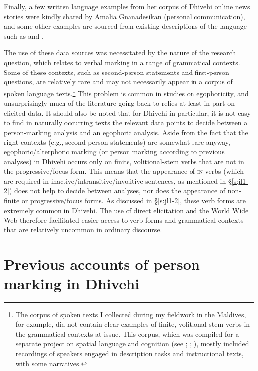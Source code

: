\documentclass[output=paper]{langsci/langscibook}
\begin{document}
   Finally, a few written language examples from her corpus of Dhivehi online news stories were kindly shared by Amalia Gnanadesikan (personal communication), and some other examples are sourced from existing descriptions of the language such as \cite{CainGair2000} and \cite{Gnanadesikan2017}. 

   The use of these data sources was necessitated by the nature of the research question, which relates to verbal marking in a range of grammatical contexts. Some of these contexts, such as second-person statements and first-person questions, are relatively rare and may not necessarily appear in a corpus of spoken language texts.\footnote{The corpus of spoken texts I collected during my fieldwork in the Maldives, for example, did not contain clear examples of finite, volitional-stem verbs in the grammatical contexts at issue. This corpus, which was compiled for a separate project on spatial language and cognition (see \citealt{Lum2018}; \citealt{Palmer2017SIP}; \citealt{Palmer2017Typ}), mostly included recordings of speakers engaged in description tasks and instructional texts, with some narratives.} 
   This problem is common in studies on egophoricity, and unsurprisingly much of the literature going back to \cite{Hale1980} relies at least in part on elicited data. It should also be noted that for Dhivehi in particular, it is not easy to find in naturally occurring texts the relevant data points to decide between a person-marking analysis and an egophoric analysis. Aside from the fact that the right contexts (e.g., second-person statements) are somewhat rare anyway, egophoric/alterphoric marking (or person marking according to previous analyses) in Dhivehi occurs only on finite, volitional-stem verbs that are not in the progressive/focus form. This means that the appearance of \textsc{in}-verbs (which are required in inactive/intransitive/involitive sentences, as mentioned in §\ref{s:jl1-2}) does not help to decide between analyses, nor does the appearance of non-finite or progressive/focus forms. As discussed in §\ref{s:jl1-2}, these verb forms are extremely common in Dhivehi. The use of direct elicitation and the World Wide Web therefore facilitated easier access to verb forms and grammatical contexts that are relatively uncommon in ordinary discourse.

\section{Previous accounts of person marking in Dhivehi}\label{s:jl2}
\end{document}
